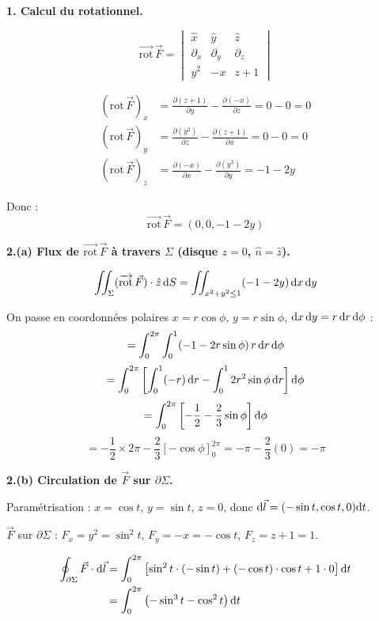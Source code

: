 \documentclass[12pt,a4paper]{article}
\begin{document}
\begin{boitecorrige}
\textbf{1. Calcul du rotationnel.}

\[
\overrightarrow{\text{rot}}\,\vec{F} = \begin{vmatrix} \hat{x} & \hat{y} & \hat{z} \\ \partial_x & \partial_y & \partial_z \\ y^2 & -x & z+1 \end{vmatrix}
\]

\begin{align*}
(\text{rot}\,\vec{F})_x &= \frac{\partial(z+1)}{\partial y} - \frac{\partial(-x)}{\partial z} = 0 - 0 = 0 \\
(\text{rot}\,\vec{F})_y &= \frac{\partial(y^2)}{\partial z} - \frac{\partial(z+1)}{\partial x} = 0 - 0 = 0 \\
(\text{rot}\,\vec{F})_z &= \frac{\partial(-x)}{\partial x} - \frac{\partial(y^2)}{\partial y} = -1 - 2y
\end{align*}

Donc :
\[
\overrightarrow{\text{rot}}\,\vec{F} = (0, 0, -1-2y)
\]

\textbf{2.(a) Flux de $\overrightarrow{\text{rot}}\,\vec{F}$ à travers $\Sigma$ (disque $z=0$, $\hat{n} = \hat{z}$).}

\[
\iint_\Sigma (\overrightarrow{\text{rot}}\,\vec{F})\cdot\hat{z}\,\mathrm{d} S = \iint_{x^2+y^2\leq 1} (-1-2y)\,\mathrm{d} x\,\mathrm{d} y
\]

On passe en coordonnées polaires $x = r\cos\phi$, $y = r\sin\phi$, $\mathrm{d} x\,\mathrm{d} y = r\,\mathrm{d} r\,\mathrm{d}\phi$ :
\[
= \int_0^{2\pi}\int_0^1 (-1 - 2r\sin\phi)\,r\,\mathrm{d} r\,\mathrm{d}\phi
\]
\[
= \int_0^{2\pi}\left[\int_0^1 (-r)\,\mathrm{d} r - \int_0^1 2r^2\sin\phi\,\mathrm{d} r\right]\mathrm{d}\phi
\]
\[
= \int_0^{2\pi}\left[-\frac{1}{2} - \frac{2}{3}\sin\phi\right]\mathrm{d}\phi
\]
\[
= -\frac{1}{2}\times2\pi - \frac{2}{3}\left[-\cos\phi\right]_0^{2\pi} = -\pi - \frac{2}{3}(0) = -\pi
\]

\textbf{2.(b) Circulation de $\vec{F}$ sur $\partial\Sigma$.}

Paramétrisation : $x = \cos t$, $y = \sin t$, $z = 0$, donc $\mathrm{d}\vec{l} = (-\sin t, \cos t, 0)\mathrm{d} t$.

$\vec{F}$ sur $\partial\Sigma$ : $F_x = y^2 = \sin^2 t$, $F_y = -x = -\cos t$, $F_z = z+1 = 1$.

\begin{align*}
\oint_{\partial\Sigma} \vec{F}\cdot\mathrm{d}\vec{l} &= \int_0^{2\pi}\left[\sin^2 t\cdot(-\sin t) + (-\cos t)\cdot\cos t + 1\cdot 0\right]\mathrm{d} t \\
&= \int_0^{2\pi}\left(-\sin^3 t - \cos^2 t\right)\mathrm{d} t
\end{align*}


\end{boitecorrige}
\end{document}
